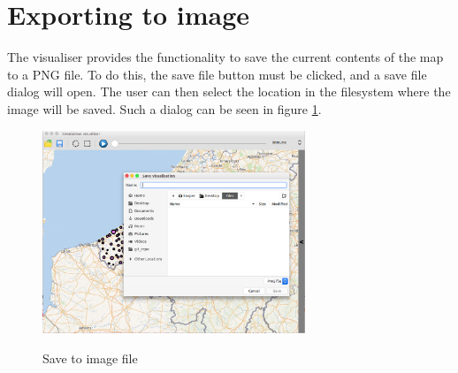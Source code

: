 

\section{Exporting to image}
\label{section:export_image}

The visualiser provides the functionality to save the current contents of the map to a PNG file. To do this, the save file button must be clicked, and a save file dialog will open. The user can then select the location in the filesystem where the image will be saved. Such a dialog can be seen in figure \ref{fig:screenshot_saveFile}.

\begin{figure}[H]
\centering
\includegraphics[width=0.7\textwidth,keepaspectratio]{images/save_file.png}
\label{fig:screenshot_saveFile}
\caption{Save to image file}
\end{figure}

